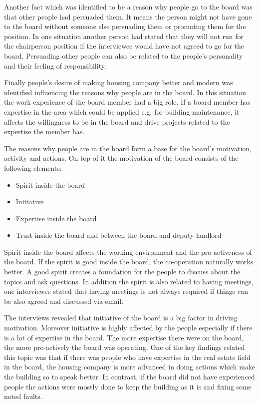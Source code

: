 Another fact which was identified to be a reason why people go to the board was that other people had persuaded them. It means the person might not have gone to the board without someone else persuading them or promoting them for the position. In one situation another person had stated that they will not run for the chairperson position if the interviewee would have not agreed to go for the board. Persuading other people can also be related to the people's personality and their feeling of responsibility.

Finally people's desire of making housing company better and modern was identified influencing the reasons why people are in the board. In this situation the work experience of the board member had a big role. If a board member has expertise in the area which could be applied e.g. for building maintenance, it affects the willingness to be in the board and drive projects related to the expertise the member has.

The reasons why people are in the board form a base for the board's motivation, activity and actions. On top of it the motivation of the board consists of the following elements:
\begin{itemize}
	\setlength{\itemsep}{1pt}
	\item Spirit inside the board
	\item Initiative
	\item Expertise inside the board
	\item Trust inside the board and between the board and deputy landlord
\end{itemize}

Spirit inside the board affects the working environment and the pro-activeness of the board. If the spirit is good inside the board, the co-operation naturally works better. A good spirit creates a foundation for the people to discuss about the topics and ask questions. In addition the spirit is also related to having meetings, one interviewee stated that having meetings is not always required if things can be also agreed and discussed via email.

The interviews revealed that initiative of the board is a big factor in driving motivation. Moreover initiative is highly affected by the people especially if there is a lot of expertise in the board. The more expertise there were on the board, the more pro-actively the board was operating. One of the key findings related this topic was that if there was people who have expertise in the real estate field in the board, the housing company is more advanced in doing actions which make the building so to speak better. In contrast, if the board did not have experienced people the actions were mostly done to keep the building as it is and fixing some noted faults.

